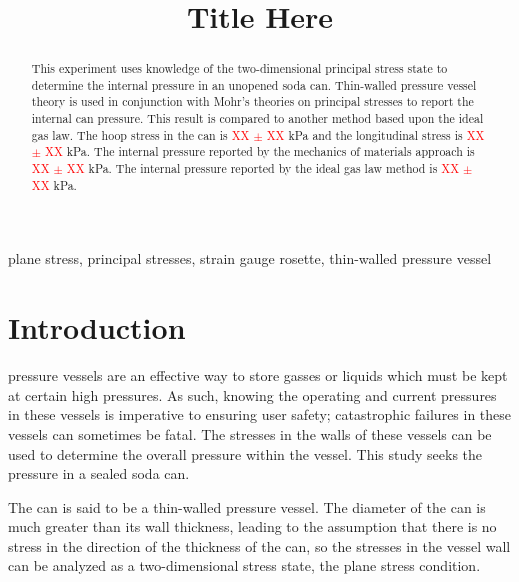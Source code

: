 \documentclass[10pt,journal,letterpaper]{IEEEtran}
\begin{document}
\title{Title Here}

\author{
}

\maketitle
\thispagestyle{empty}

\begin{abstract}
This experiment uses knowledge of the two-dimensional principal stress state to determine the internal pressure in an unopened soda can.
Thin-walled pressure vessel theory is used in conjunction with Mohr’s theories on principal stresses to report the internal can pressure.
This result is compared to another method based upon the ideal gas law.
The hoop stress in the can is \textcolor{red}{XX $\pm$ XX} kPa and the longitudinal stress is \textcolor{red}{XX $\pm$ XX} kPa.
The internal pressure reported by the mechanics of materials approach is \textcolor{red}{XX $\pm$ XX} kPa.
The internal pressure reported by the ideal gas law method is \textcolor{red}{XX $\pm$ XX} kPa.

\end{abstract}

\begin{IEEEkeywords}
plane stress, principal stresses, strain gauge rosette, thin-walled pressure vessel
\end{IEEEkeywords}

\section{Introduction}
 pressure vessels are an effective way to store gasses or liquids which must be kept at certain high pressures.
As such, knowing the operating and current pressures in these vessels is imperative to ensuring user safety; catastrophic failures in these vessels can sometimes be fatal.
The stresses in the walls of these vessels can be used to determine the overall pressure within the vessel.
This study seeks the pressure in a sealed soda can.

The can is said to be a thin-walled pressure vessel.
The diameter of the can is much greater than its wall thickness, leading to the  assumption that there is no stress in the direction of the thickness of the can, so the stresses in the vessel wall can be analyzed as a two-dimensional stress state, the plane stress condition.
\end{document}
